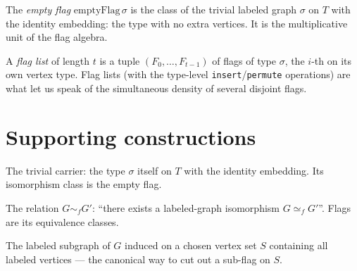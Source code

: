 \begin{definition}
  \label{def:empty-flag}
  \leanok
  The \emph{empty flag} $\mathrm{emptyFlag}\,\sigma$ is the class of the trivial
  labeled graph $\sigma$ on $T$ with the identity embedding: the type with no
  extra vertices. It is the multiplicative unit of the flag algebra.
\end{definition}

\begin{definition}
  \label{def:flag-list}
  \leanok
  A \emph{flag list} of length $t$ is a tuple $(F_0,\dots,F_{t-1})$ of flags of
  type $\sigma$, the $i$-th on its own vertex type. Flag lists (with the
  type-level \texttt{insert}/\texttt{permute} operations) are what let us speak
  of the simultaneous density of several disjoint flags.
\end{definition}

\section{Supporting constructions}

\begin{definition}
  \label{def:empty-labeled-graph}
  \leanok
  The trivial carrier: the type $\sigma$ itself on $T$ with the identity
  embedding. Its isomorphism class is the empty flag.
\end{definition}

\begin{definition}
  \label{def:flag-eqv}
  \leanok
  The relation $G \sim_f G'$: ``there exists a labeled-graph isomorphism
  $G \simeq_f G'$''. Flags are its equivalence classes.
\end{definition}

\begin{definition}
  \label{def:induced-labeled-subgraph}
  \leanok
  The labeled subgraph of $G$ induced on a chosen vertex set $S$ containing all
  labeled vertices --- the canonical way to cut out a sub-flag on $S$.
\end{definition}

